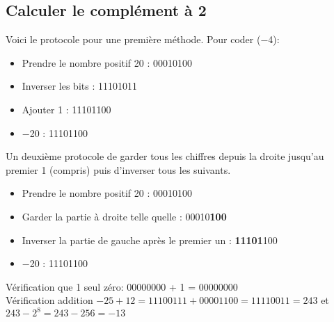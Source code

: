\documentclass[a4paper,11pt]{article}
\begin{document}
\begin{Form}
\subsection{Calculer le complément à 2}
Voici le protocole pour une première méthode. Pour coder (−4):
\begin{itemize}
\item Prendre le nombre positif 20 : 00010100
\item Inverser les bits : 11101011
\item Ajouter 1 : 11101100
\item −20 : 11101100
\end{itemize} 
\medskip
Un deuxième protocole de garder tous les chiffres depuis la droite jusqu'au premier 1 (compris) puis d'inverser tous les suivants.
\begin{itemize}
\item Prendre le nombre positif 20 : 00010100
\item Garder la partie à droite telle quelle : 00010\textbf{100}
\item Inverser la partie de gauche après le premier un : \textbf{11101}100
\item −20 : 11101100
\end{itemize}
\begin{commentprof}
Vérification que 1 seul zéro: 00000000  + 1 = 00000000\\
Vérification addition $-25+12= 11100111+00001100 = 11110011 = 243$ et $243-2^8=243-256=-13$
\end{commentprof}
\end{Form}
\end{document}

